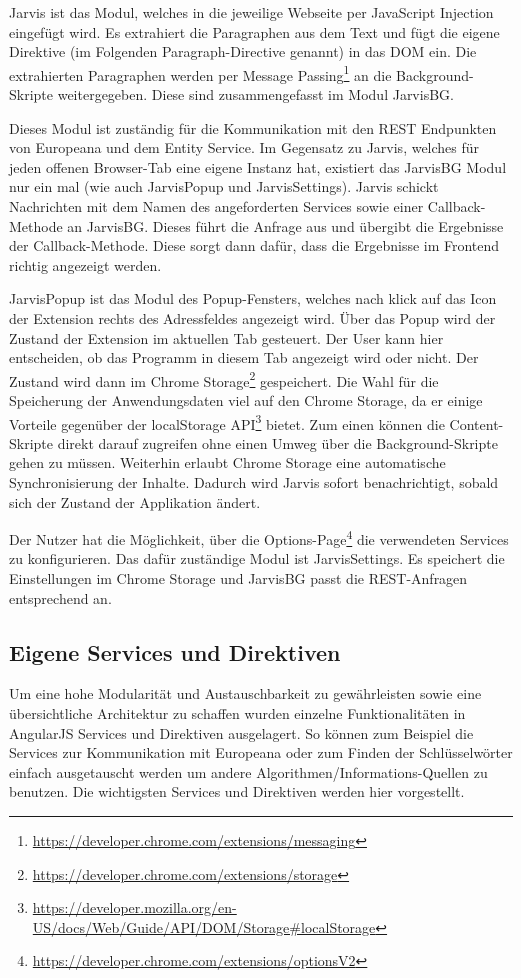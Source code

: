  Jarvis ist das Modul, welches in die jeweilige Webseite per JavaScript Injection eingefügt wird. Es extrahiert die Paragraphen aus dem Text und fügt die eigene Direktive (im Folgenden Paragraph-Directive genannt) in das DOM ein. Die extrahierten Paragraphen werden per Message Passing\footnote{\url{https://developer.chrome.com/extensions/messaging}} an die Background-Skripte weitergegeben. Diese sind zusammengefasst im Modul JarvisBG. 

 Dieses Modul ist zuständig für die Kommunikation mit den REST Endpunkten von Europeana und dem Entity Service. Im Gegensatz zu Jarvis, welches für jeden offenen Browser-Tab eine eigene Instanz hat, existiert das JarvisBG Modul nur ein mal (wie auch JarvisPopup und JarvisSettings). Jarvis schickt Nachrichten mit dem Namen des angeforderten Services sowie einer Callback-Methode an JarvisBG. Dieses führt die Anfrage aus und übergibt die Ergebnisse der Callback-Methode. Diese sorgt dann dafür, dass die Ergebnisse im Frontend richtig angezeigt werden. 

 JarvisPopup ist das Modul des Popup-Fensters, welches nach klick auf das Icon der Extension rechts des Adressfeldes angezeigt wird. Über das Popup wird der Zustand der Extension im aktuellen Tab gesteuert. Der User kann hier entscheiden, ob das Programm in diesem Tab angezeigt wird oder nicht. Der Zustand wird dann im Chrome Storage\footnote{\url{https://developer.chrome.com/extensions/storage}} gespeichert. Die Wahl für die Speicherung der Anwendungsdaten viel auf den Chrome Storage, da er einige Vorteile gegenüber der localStorage API\footnote{\url{https://developer.mozilla.org/en-US/docs/Web/Guide/API/DOM/Storage\#localStorage}} bietet. Zum einen können die Content-Skripte direkt darauf zugreifen ohne einen Umweg über die Background-Skripte gehen zu müssen. Weiterhin erlaubt Chrome Storage eine automatische Synchronisierung der Inhalte. Dadurch wird Jarvis sofort benachrichtigt, sobald sich der Zustand der Applikation ändert.

 Der Nutzer hat die Möglichkeit, über die Options-Page\footnote{\url{https://developer.chrome.com/extensions/optionsV2}} die verwendeten Services zu konfigurieren. Das dafür zuständige Modul ist JarvisSettings. Es speichert die Einstellungen im Chrome Storage und JarvisBG passt die REST-Anfragen entsprechend an.

 \subsection{Eigene Services und Direktiven}
 Um eine hohe Modularität und Austauschbarkeit zu gewährleisten sowie eine übersichtliche Architektur zu schaffen wurden einzelne Funktionalitäten in AngularJS Services und Direktiven ausgelagert. So können zum Beispiel die Services zur Kommunikation mit Europeana oder zum Finden der Schlüsselwörter einfach ausgetauscht werden um andere Algorithmen/Informations-Quellen zu benutzen. Die wichtigsten Services und Direktiven werden hier vorgestellt.


